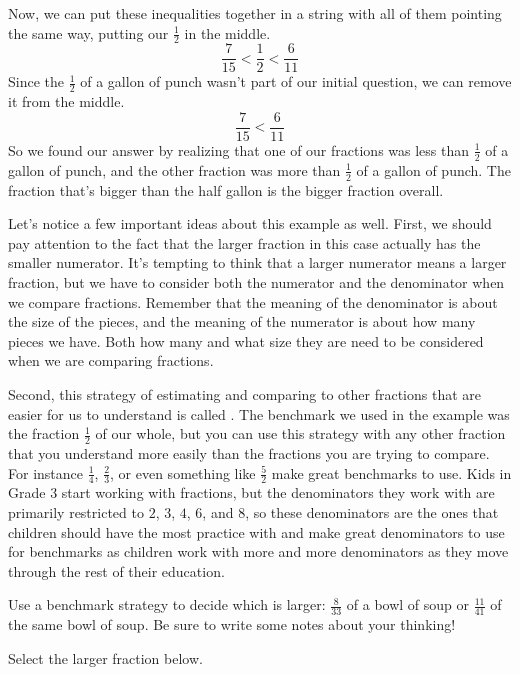 \documentclass{ximera}
\begin{document}
\begin{question}
\begin{explanation}
Now, we can put these inequalities together in a string with all of them pointing the same way, putting our $\frac{1}{2}$ in the middle.
\[
\frac{7}{15} < \frac{1}{2} < \frac{6}{11}
\]
Since the $\frac{1}{2}$ of a gallon of punch wasn't part of our initial question, we can remove it from the middle.
\[
\frac{7}{15} < \frac{6}{11}
\]
So we found our answer by realizing that one of our fractions was less than $\frac{1}{2}$ of a gallon of punch, and the other fraction was more than $\frac{1}{2}$ of a gallon of punch. The fraction that's bigger than the half gallon is the bigger fraction overall.


\end{explanation}
\end{question}

Let's notice a few important ideas about this example as well. First, we should pay attention to the fact that the larger fraction in this case actually has the smaller numerator. It's tempting to think that a larger numerator means a larger fraction, but we have to consider both the numerator and the denominator when we compare fractions. Remember that the meaning of the denominator is about the size of the pieces, and the meaning of the numerator is about how many pieces we have. Both how many and what size they are need to be considered when we are comparing fractions.

Second, this strategy of estimating and comparing to other fractions that are easier for us to understand is called . The benchmark we used in the example was the fraction $\frac{1}{2}$ of our whole, but you can use this strategy with any other fraction that you understand more easily than the fractions you are trying to compare. For instance $\frac{1}{4}$, $\frac{2}{3}$, or even something like $\frac{5}{2}$ make great benchmarks to use. Kids in Grade 3 start working with fractions, but the denominators they work with are primarily restricted to $2$, $3$, $4$, $6$, and $8$,  so these denominators are the ones that children should have the most practice with and make great denominators to use for benchmarks as children work with more and more denominators as they move through the rest of their education.

\begin{question}
Use a benchmark strategy to decide which is larger: $\frac{8}{33}$ of a bowl of soup or $\frac{11}{41}$ of the same bowl of soup. Be sure to write some notes about your thinking!

Select the larger fraction below.
\begin{multipleChoice}
\end{multipleChoice}
\end{question}
\end{document}
